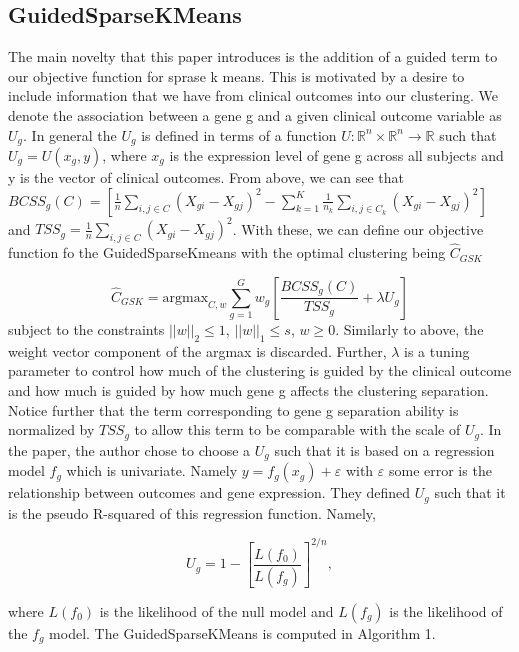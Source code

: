 \documentclass{statsoc}
\newcommand{\RR}{\mathbb{R}}
\begin{document}
\subsection{GuidedSparseKMeans}

The main novelty that this paper introduces is the addition of a guided term to our objective function for sprase k means. This is motivated by a desire to include information that we have from clinical outcomes into our clustering. We denote the association between a gene g and a given clinical outcome variable as $U_g$. In general the $U_g$ is defined in terms of a function $U: \RR^n \times \RR^n \rightarrow \RR$ such that $U_g = U(x_g, y)$, where $x_g$ is the expression level of gene g across all subjects and y is the vector of clinical outcomes. From above, we can see that $BCSS_g(C) = \left[\frac{1}{n} \sum_{i,j \in C} (X_{gi} - X_{gj})^2 - \sum_{k=1}^K \frac{1}{n_k}\sum_{i,j \in C_k} (X_{gi} - X_{gj})^2 \right]$ and $TSS_g = \frac{1}{n} \sum_{i,j \in C} (X_{gi} - X_{gj})^2$. With these, we can define our objective function fo the GuidedSparseKmeans with the optimal clustering being $\hat{C}_{GSK}$

\begin{equation}
    \hat{C}_{GSK} = \textrm{argmax}_{C,w} \sum_{g=1}^G w_g \left[ \frac{BCSS_g(C)}{TSS_g} + \lambda U_g  \right]
\end{equation}
subject to the constraints $||w||_2 \leq 1$, $||w||_1 \leq s$, $w \geq 0$. Similarly to above, the weight vector component of the argmax is discarded. Further, $\lambda$ is a tuning parameter to control how much of the clustering is guided by the clinical outcome and how much is guided by how much gene g affects the clustering separation. Notice further that the term corresponding to gene g separation ability is normalized by $TSS_g$ to allow this term to be comparable with the scale of $U_g$.  In the paper, the author chose to choose a $U_g$ such that it is based on a regression model $f_g$ which is univariate. Namely $y = f_g(x_g) + \varepsilon$ with $\varepsilon$ some error is the relationship between outcomes and gene expression. They defined $U_g$ such that it is the pseudo R-squared of this regression function. Namely,

\begin{equation*}
    U_g = 1- \left[\frac{L(f_0)}{L(f_g)} \right]^{2/n},
\end{equation*}

where $L(f_0)$ is the likelihood of the null model and $L(f_g)$ is the likelihood of the $f_g$ model. The GuidedSparseKMeans is computed in Algorithm 1. 
\end{document}
